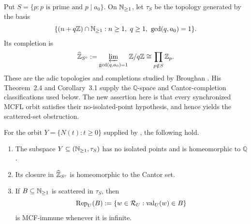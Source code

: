 Put \(S=\{p:p\text{ is prime and }p\mid a_0\}\). On
\(\mathbb{N}_{\ge1}\), let \(\tau_S\) be the topology generated by the basis
\[
  \{(n+q\ZZ)\cap\NN_{\ge1}:n\ge1,\ q\ge1,\ \gcd(q,a_0)=1\}.
\]
Its completion is
\[
  \widehat{\mathbb{Z}}_{S^c}
    :=\varprojlim_{\gcd(q,a_0)=1}\mathbb{Z}/q\mathbb{Z}
    \cong\prod_{p\notin S}\mathbb{Z}_p.
\]
These are the adic topologies and completions studied by Broughan
\cite{Broughan2003}. His Theorem~2.4 and Corollary~3.1 supply the
\(\mathbb Q\)-space and Cantor-completion classifications used below. The
new assertion here is that every synchronized MCFL orbit satisfies their
no-isolated-point hypothesis, and hence yields the scattered-set
obstruction.

\begin{theorem}
  \label{thm:mcfl-local-adic-fingerprint}
  For the orbit \(Y=\{N(t):t\ge0\}\) supplied by
  , the following hold.
  \begin{enumerate}[label=\textup{(\roman*)}]
    \item The subspace \(Y\subseteq(\mathbb{N}_{\ge1},\tau_S)\) has no isolated
    points and is homeomorphic to \(\mathbb Q\).
    \item Its closure in \(\widehat{\mathbb{Z}}_{S^c}\) is homeomorphic to the
    Cantor set.
    \item If \(B\subseteq\mathbb{N}_{\ge1}\) is scattered in \(\tau_S\), then
    \[
      \operatorname{Rep}_U(B)
        :=\{w\in\mathcal R_U:\operatorname{val}_U(w)\in B\}
    \]
    is MCF-immune whenever it is infinite.
  \end{enumerate}
\end{theorem}

